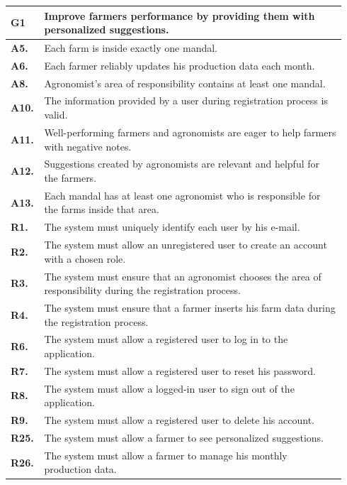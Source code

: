 \begin{longtable}{p{0.06\linewidth} p{0.88\linewidth}} 
    \toprule
    \textbf{G1} & Improve farmers performance by providing them with personalized suggestions. \\ 
    \midrule
    \textbf{A5.} & Each farm is inside exactly one mandal.\\ 
    \textbf{A6.} & Each farmer reliably updates his production data each month.\\ 
    \textbf{A8.} & Agronomist's area of responsibility contains at least one mandal.\\ 
    \textbf{A10.} & The information provided by a user during registration process is valid.\\ 
    \textbf{A11.} & Well-performing farmers and agronomists are eager to help farmers with negative notes.\\ 
    \textbf{A12.} & Suggestions created by agronomists are relevant and helpful for the farmers. \\
    \textbf{A13.} & Each mandal has at least one agronomist who is responsible for the farms inside that area.\\ 
     
    \midrule		
	\textbf{R1.} & The system must uniquely identify each user by his e-mail. \\
	\textbf{R2.} & The system must allow an unregistered user to create an account with a chosen role. \\
	\textbf{R3.} & The system must ensure that an agronomist chooses the area of responsibility during the registration process. \\
	\textbf{R4.} & The system must ensure that a farmer inserts his farm data during the registration process.\\
	\textbf{R6.} & The system must allow a registered user to log in to the application. \\
	\textbf{R7.} & The system must allow a registered user to reset his password. \\
	\textbf{R8.} & The system must allow a logged-in user to sign out of the application. \\
	\textbf{R9.} & The system must allow a registered user to delete his account. \\
	
	\textbf{R25.} & The system must allow a farmer to see personalized suggestions.\\
	\textbf{R26.} & The system must allow a farmer to manage his monthly production data.\\
	

\end{longtable}

